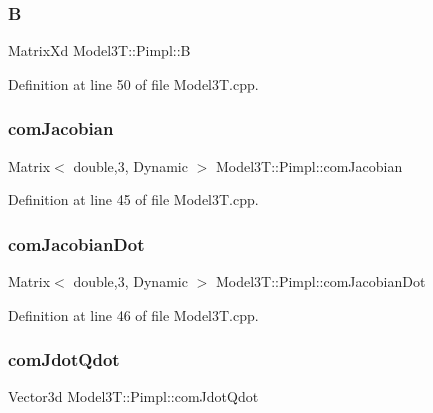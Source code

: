 \subsubsection{\texorpdfstring{B}{B}}
{\footnotesize\ttfamily Matrix\+Xd Model3\+T\+::\+Pimpl\+::B}



Definition at line 50 of file Model3\+T.\+cpp.

\hypertarget{structModel3T_1_1Pimpl_ab93624d4ec1d08338eb24528b8a3ca68}{}\label{structModel3T_1_1Pimpl_ab93624d4ec1d08338eb24528b8a3ca68} 
\subsubsection{\texorpdfstring{com\+Jacobian}{comJacobian}}
{\footnotesize\ttfamily Matrix$<$ double,3, Dynamic $>$ Model3\+T\+::\+Pimpl\+::com\+Jacobian}



Definition at line 45 of file Model3\+T.\+cpp.

\hypertarget{structModel3T_1_1Pimpl_ad1f6cba54dc65db31d3a4e54ba00acdf}{}\label{structModel3T_1_1Pimpl_ad1f6cba54dc65db31d3a4e54ba00acdf} 
\subsubsection{\texorpdfstring{com\+Jacobian\+Dot}{comJacobianDot}}
{\footnotesize\ttfamily Matrix$<$ double,3, Dynamic $>$ Model3\+T\+::\+Pimpl\+::com\+Jacobian\+Dot}



Definition at line 46 of file Model3\+T.\+cpp.

\hypertarget{structModel3T_1_1Pimpl_a997711d057aa854ab997992497fe276b}{}\label{structModel3T_1_1Pimpl_a997711d057aa854ab997992497fe276b} 
\subsubsection{\texorpdfstring{com\+Jdot\+Qdot}{comJdotQdot}}
{\footnotesize\ttfamily Vector3d Model3\+T\+::\+Pimpl\+::com\+Jdot\+Qdot}



